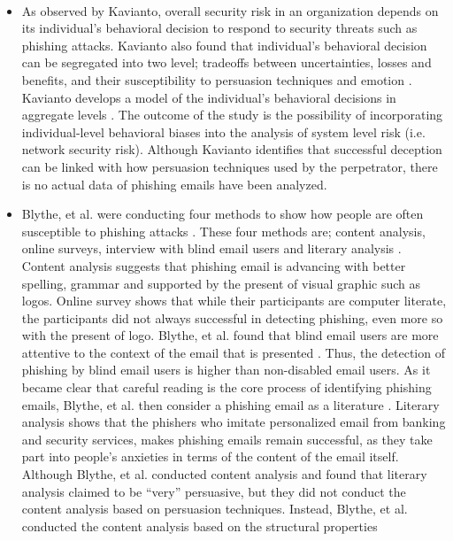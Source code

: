 %
\ 
%
\begin{itemize}
\item As observed by Kavianto, overall security risk in an organization
depends on its individual\textquoteright s behavioral decision to
respond to security threats such as phishing attacks. Kavianto also
found that individual's behavioral decision can be segregated into
two level; tradeoffs between uncertainties, losses and benefits, and
their susceptibility to persuasion techniques \citep{cialdini:2001}
and emotion \citep{kaivanto2014effect}. Kavianto develops a model
of the individual's behavioral decisions in aggregate levels \citep{kaivanto2014effect}.
The outcome of the study is the possibility of incorporating individual-level
behavioral biases into the analysis of system level risk (i.e. network
security risk). Although Kavianto identifies that successful deception
can be linked with how persuasion techniques used by the perpetrator,
there is no actual data of phishing emails have been analyzed.
\item Blythe, et al. were conducting four methods to show how people are
often susceptible to phishing attacks \citep{blythe2011f}. These
four methods are; content analysis, online surveys, interview with
blind email users and literary analysis \citep{blythe2011f}. Content
analysis suggests that phishing email is advancing with better spelling,
grammar and supported by the present of visual graphic such as logos.
Online survey shows that while their participants are computer literate,
the participants did not always successful in detecting phishing,
even more so with the present of logo. Blythe, et al. found that blind
email users are more attentive to the context of the email that is
presented \citep{blythe2011f}. Thus, the detection of phishing by
blind email users is higher than non-disabled email users. As it became
clear that careful reading is the core process of identifying phishing
emails, Blythe, et al. then consider a phishing email as a literature
\citep{blythe2011f}. Literary analysis shows that the phishers who
imitate personalized email from banking and security services, makes
phishing emails remain successful, as they take part into people\textquoteright s
anxieties in terms of the content of the email itself. Although Blythe,
et al. conducted content analysis and found that literary analysis
claimed to be ``very'' persuasive, but they did not conduct the
content analysis based on persuasion techniques. Instead, Blythe,
et al. conducted the content analysis based on the structural properties

\end{itemize}
